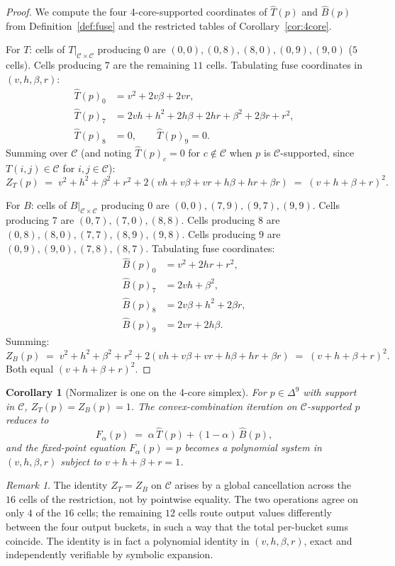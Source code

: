 \documentclass[11pt,reqno]{amsart}
\theoremstyle{plain}
\newtheorem{corollary}[theorem]{Corollary}
\theoremstyle{definition}
\theoremstyle{remark}
\newtheorem*{remark}{Remark}
\newcommand{\Cfour}{\mathcal{C}}
\newcommand{\Tfuse}{\widehat{T}}
\newcommand{\Bfuse}{\widehat{B}}
\newcommand{\Fmix}{F_{\alpha}}
\newcommand{\Simp}{\Delta^{9}}
\begin{document}
\begin{proof}
We compute the four 4-core-supported coordinates of $\Tfuse(p)$
and $\Bfuse(p)$ from Definition~\ref{def:fuse} and the restricted
tables of Corollary~\ref{cor:4core}.

For $T$: cells of $T\big|_{\Cfour\times\Cfour}$ producing $0$ are
$(0,0),(0,8),(8,0),(0,9),(9,0)$ ($5$ cells). Cells producing $7$
are the remaining $11$ cells. Tabulating fuse coordinates in
$(v,h,\beta,r)$:
\begin{align*}
\Tfuse(p)_{0}&=v^{2}+2v\beta+2vr,\\
\Tfuse(p)_{7}&=2vh+h^{2}+2h\beta+2hr+\beta^{2}+2\beta r+r^{2},\\
\Tfuse(p)_{8}&=0,\qquad \Tfuse(p)_{9}=0.
\end{align*}
Summing over $\Cfour$ (and noting $\Tfuse(p)_{c}=0$ for
$c\notin\Cfour$ when $p$ is $\Cfour$-supported, since $T(i,j)\in\Cfour$
for $i,j\in\Cfour$):
\[
Z_{T}(p)\;=\;v^{2}+h^{2}+\beta^{2}+r^{2}+2(vh+v\beta+vr+h\beta+hr+\beta r)\;=\;(v+h+\beta+r)^{2}.
\]

For $B$: cells of $B\big|_{\Cfour\times\Cfour}$ producing $0$ are
$(0,0),(7,9),(9,7),(9,9)$. Cells producing $7$ are
$(0,7),(7,0),(8,8)$. Cells producing $8$ are
$(0,8),(8,0),(7,7),(8,9),(9,8)$. Cells producing $9$ are
$(0,9),(9,0),(7,8),(8,7)$. Tabulating fuse coordinates:
\begin{align*}
\Bfuse(p)_{0}&=v^{2}+2hr+r^{2},\\
\Bfuse(p)_{7}&=2vh+\beta^{2},\\
\Bfuse(p)_{8}&=2v\beta+h^{2}+2\beta r,\\
\Bfuse(p)_{9}&=2vr+2h\beta.
\end{align*}
Summing:
\[
Z_{B}(p)\;=\;v^{2}+h^{2}+\beta^{2}+r^{2}+2(vh+v\beta+vr+h\beta+hr+\beta r)\;=\;(v+h+\beta+r)^{2}.
\]
Both equal $(v+h+\beta+r)^{2}$.
\end{proof}

\begin{corollary}[Normalizer is one on the 4-core simplex]\label{cor:Z=1}
For $p\in\Simp$ with support in $\Cfour$, $Z_{T}(p)=Z_{B}(p)=1$.
The convex-combination iteration on $\Cfour$-supported $p$ reduces
to
\[
\Fmix(p)\;=\;\alpha\,\Tfuse(p)+(1-\alpha)\,\Bfuse(p),
\]
and the fixed-point equation $\Fmix(p)=p$ becomes a polynomial
system in $(v,h,\beta,r)$ subject to $v+h+\beta+r=1$.
\end{corollary}

\begin{remark}
The identity $Z_{T}=Z_{B}$ on $\Cfour$ arises by a global
cancellation across the $16$ cells of the restriction, not by
pointwise equality. The two operations agree on only $4$ of the
$16$ cells; the remaining $12$ cells route output values
differently between the four output buckets, in such a way that
the total per-bucket sums coincide. The identity is in fact a
polynomial identity in $(v,h,\beta,r)$, exact and independently
verifiable by symbolic expansion.
\end{remark}
\end{document}
